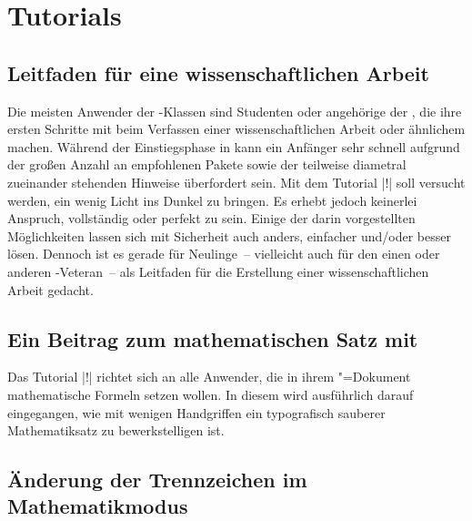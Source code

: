 \chapter{%
  Tutorials%
  \label{sec:tut}%
}
\section{%
  Leitfaden für eine wissenschaftlichen Arbeit%
}

Die meisten Anwender der \TUDScript-Klassen sind Studenten oder angehörige der 
\TnUD, die ihre ersten Schritte mit  beim Verfassen einer 
wissenschaftlichen Arbeit oder ähnlichem machen. Während der Einstiegsphase in 
 kann ein Anfänger sehr schnell aufgrund der großen Anzahl an 
empfohlenen Pakete sowie der teilweise diametral zueinander stehenden Hinweise 
überfordert sein. Mit dem Tutorial |!| soll versucht werden, 
ein wenig Licht ins Dunkel zu bringen. Es erhebt jedoch keinerlei Anspruch, 
vollständig oder perfekt zu sein. Einige der darin vorgestellten Möglichkeiten 
lassen sich mit Sicherheit auch anders, einfacher und/oder besser lösen. 
Dennoch ist es gerade für Neulinge~-- vielleicht auch für den einen oder 
anderen -Veteran~-- als Leitfaden für die Erstellung einer 
wissenschaftlichen Arbeit gedacht.



\section{%
  Ein Beitrag zum mathematischen Satz mit %
}

Das Tutorial |!| richtet sich an alle Anwender, die in ihrem 
"=Dokument mathematische Formeln setzen wollen. In diesem wird 
ausführlich darauf eingegangen, wie mit wenigen Handgriffen ein typografisch 
sauberer Mathematiksatz zu bewerkstelligen ist.



\section{%
  Änderung der Trennzeichen im Mathematikmodus%
}

